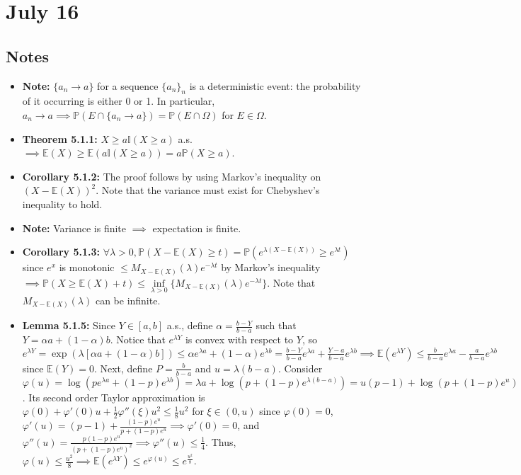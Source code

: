\documentclass[12pt]{article}
\newcommand{\E}{\mathbb{E}}
\newcommand{\p}{\mathbb{P}}
\begin{document}
\section*{July 16}

\subsection*{Notes}
\begin{itemize}
    \item \textbf{Note:} $\{a_n \to a\}$ for a sequence $\{a_n\}_n$ is a deterministic event: the probability of it occurring is either 0 or 1. In particular, $a_n \to a \implies \p(E \cap \{a_n \to a\}) = \p(E \cap \Omega)$ for $E \in \Omega$.
    \item \textbf{Theorem 5.1.1:} $X \geq a\mathbb{I}(X \geq a)$ a.s. $\implies \E(X) \geq \E(a\mathbb{I}(X \geq a)) = a\p(X \geq a)$.
    \item \textbf{Corollary 5.1.2:} The proof follows by using Markov's inequality on $(X - \E(X))^2$. Note that the variance must exist for Chebyshev's inequality to hold.
    \item \textbf{Note:} Variance is finite $\implies$ expectation is finite.
    \item \textbf{Corollary 5.1.3:} $\forall \lambda > 0, \p(X - \E(X) \geq t) = \p(e^{\lambda(X - \E(X))} \geq e^{\lambda t})$ since $e^x$ is monotonic $\leq M_{X - \E(X)}(\lambda) e^{-\lambda t}$ by Markov's inequality $\implies \p(X \geq \E(X) + t) \leq \inf \limits_{\lambda > 0} \{M_{X - \E(X)}(\lambda) e^{-\lambda t}\}$. Note that $M_{X - \E(X)}(\lambda)$ can be infinite.
    \item \textbf{Lemma 5.1.5:} Since $Y \in [a, b]$ a.s., define $\alpha = \frac{b-Y}{b-a}$ such that $Y = \alpha a + (1-\alpha) b$. Notice that $e^{\lambda Y}$ is convex with respect to $Y$, so $e^{\lambda Y} = \exp(\lambda[\alpha a + (1-\alpha)b]) \leq \alpha e^{\lambda a} + (1-\alpha) e^{\lambda b} = \frac{b-Y}{b-a} e^{\lambda a} + \frac{Y-a}{b-a} e^{\lambda b} \implies \E(e^{\lambda Y}) \leq \frac{b}{b-a} e^{\lambda a} - \frac{a}{b-a} e^{\lambda b}$ since $\E(Y) = 0$. Next, define $P = \frac{b}{b-a}$ and $u = \lambda(b - a)$. Consider $\varphi(u) = \log(pe^{\lambda a} + (1 - p)e^{\lambda b}) = \lambda a + \log(p + (1 - p)e^{\lambda(b-a)}) = u(p-1) + \log(p + (1 - p)e^u)$. Its second order Taylor approximation is $\varphi(0) + \varphi'(0)u + \frac{1}{2} \varphi''(\xi)u^2 \leq \frac{1}{8}u^2$ for $\xi \in (0, u)$ since $\varphi(0) = 0$, $\varphi'(u) = (p - 1) + \frac{(1-p)e^u}{p+(1-p)e^u} \implies \varphi'(0) = 0$, and $\varphi''(u) = \frac{p(1-p)e^u}{(p+(1-p)e^u)^2} \implies \varphi''(u) \leq \frac{1}{4}$. Thus, $\varphi(u) \leq \frac{u^2}{8} \implies \E(e^{\lambda Y}) \leq e^{\varphi(u)} \leq e^{\frac{u^2}{8}}$.

\end{itemize}
\end{document}
